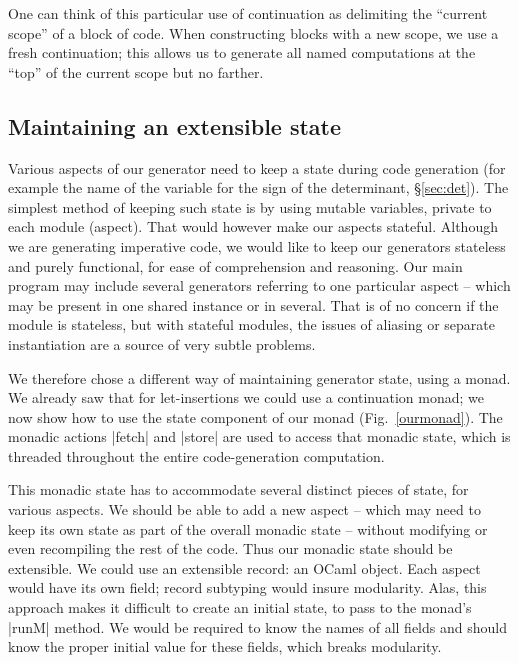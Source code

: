 \documentclass{elsart}
\begin{document}
One can think of this particular use of continuation as delimiting the 
``current scope'' of a block of code.  When constructing blocks
with a new scope, we use a fresh continuation; this allows us to generate
all named computations at the ``top'' of the current scope but no farther.

\subsection{Maintaining an extensible state}\label{ssec:state}

Various aspects of our generator need to keep a state during
code generation (for example the name of the variable for the sign of
the determinant, \S\ref{sec:det}).
The simplest method of keeping such state is by using
mutable variables, private to each module (aspect). That would however
make our aspects stateful. Although we are generating imperative code,
we would like to keep our generators stateless and purely functional,
for ease of comprehension and reasoning.  Our main program may include
several generators referring to one particular aspect -- which may be
present in one shared instance or in several. That is of no concern if
the module is stateless, but with stateful modules, the issues of
aliasing or separate instantiation are a source of very subtle
problems.

We therefore chose a different way of maintaining generator state,
using a monad. We already saw that for let-insertions we could use
a continuation monad;  we now show how to use the state component
of our monad (Fig.~\ref{ourmonad}). The monadic actions |fetch| and
|store| are used to access that monadic state, which is
threaded throughout the entire code-generation computation. 

This monadic state has to accommodate several distinct pieces of state, for
various aspects. We should be able to add a new aspect -- which may need
to keep its own state as part of the overall monadic state -- without
modifying or even recompiling the rest of the code. Thus our monadic
state should be extensible. We could use an extensible
record: an OCaml object. Each aspect would have its own field; record
subtyping would insure modularity. Alas, this approach makes it
difficult to create an initial state, to pass to the monad's |runM|
method. We would be required to know the names of all fields and should know
the proper initial value for these fields, which breaks modularity.
\end{document}
